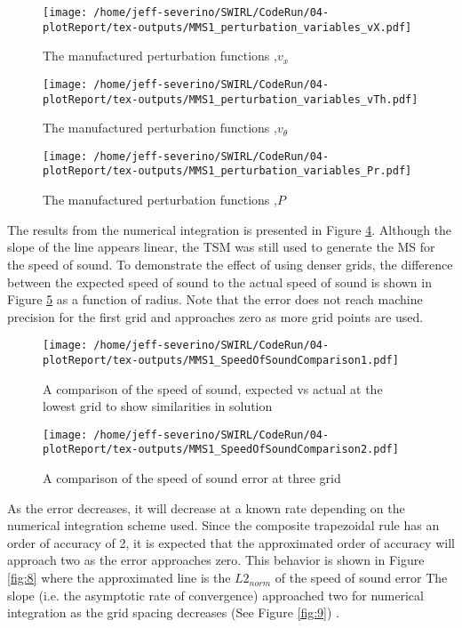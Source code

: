 \begin{figure}[!]
    \centering
    \texttt{[image: /home/jeff-severino/SWIRL/CodeRun/04-plotReport/tex-outputs/MMS1\_perturbation\_variables\_vX.pdf]}
\caption{The manufactured perturbation functions ,$v_x$}%
    \label{fig:2a}
\end{figure}


\begin{figure}[!]
    \centering
    \texttt{[image: /home/jeff-severino/SWIRL/CodeRun/04-plotReport/tex-outputs/MMS1\_perturbation\_variables\_vTh.pdf]}
    \caption{The manufactured perturbation functions ,$v_{\theta}$}%
    \label{fig:3a}
\end{figure}


\begin{figure}[!]
    \centering
    \texttt{[image: /home/jeff-severino/SWIRL/CodeRun/04-plotReport/tex-outputs/MMS1\_perturbation\_variables\_Pr.pdf]}
\caption{The manufactured perturbation functions ,$P$}%
    \label{fig:4a}
\end{figure}

The results from the numerical integration is presented in Figure \ref{fig:5}. Although 
the slope of the line appears linear, the TSM was still used to generate the 
MS for the speed of sound. To demonstrate the effect of using denser grids, the 
difference between the expected speed of sound to the actual speed of sound is 
shown in Figure \ref{fig:5a} as a function of radius. 
Note that the error does not reach machine precision for the first grid and 
approaches zero as more grid points are used. 

\begin{figure}[!]
    \centering
    \texttt{[image: /home/jeff-severino/SWIRL/CodeRun/04-plotReport/tex-outputs/MMS1\_SpeedOfSoundComparison1.pdf]}
    \caption{ A comparison of the speed of sound, expected vs actual at the lowest grid to show similarities in solution}
    \label{fig:5}
\end{figure}


\begin{figure}[!]
    \centering
    \texttt{[image: /home/jeff-severino/SWIRL/CodeRun/04-plotReport/tex-outputs/MMS1\_SpeedOfSoundComparison2.pdf]}
    \caption{ A comparison of the speed of sound error at three grid}
    \label{fig:5a}
\end{figure}


As the error decreases, it will decrease at a known rate depending on the numerical
integration scheme used. Since the composite trapezoidal rule has an order of accuracy of 2, 
it is expected that the approximated order of accuracy will approach two as
the error approaches zero. This behavior is shown in Figure \ref{fig:8} where the approximated
line is the $L2_{norm}$ of the speed of sound error 
 The slope (i.e. the asymptotic rate of convergence) approached two for 
 numerical integration as the grid spacing decreases (See Figure \ref{fig:9}) .

